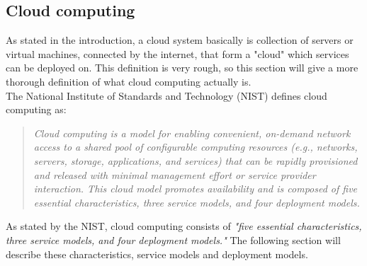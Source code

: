 \documentclass[12pt,a4paper]{article}
\begin{document}
\subsection{Cloud computing}\label{subsec:CloudComputing}
As stated in the introduction, a cloud system basically is collection of servers or virtual machines, connected by the internet, that form a "cloud" which services can be deployed on. This definition is very rough, so this section will give a more thorough definition of what cloud computing actually is. \\

The National Institute of Standards and Technology (NIST) defines cloud computing as:
\begin{quote}
\emph{Cloud computing is a model for enabling convenient, on-demand network access to a shared 
pool of configurable computing resources (e.g., networks, servers, storage, applications, and 
services) that can be rapidly provisioned and released with minimal management effort or 
service provider interaction. This cloud model promotes availability and is composed of five 
essential characteristics, three service models, and four deployment models.}\cite{nist}
\end{quote}

As stated by the NIST, cloud computing consists of \emph{"five 
essential characteristics, three service models, and four deployment models."}\cite{nist} The following section will describe these characteristics, service models and deployment models. \\
\end{document}
